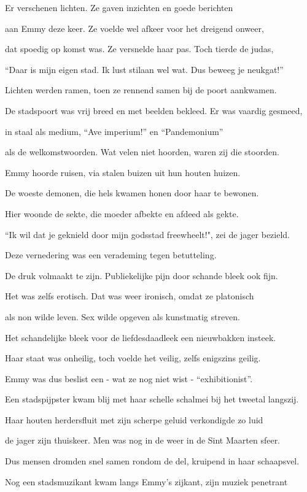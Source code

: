 Er verschenen lichten.
Ze gaven inzichten
en goede berichten

aan Emmy deze keer.
Ze voelde wel afkeer
voor het dreigend onweer,

dat spoedig op komst was.
Ze versnelde haar pas.
Toch tierde de judas,

“Daar is mijn eigen stad.
Ik lust stilaan wel wat.
Dus beweeg je neukgat!”

Lichten werden ramen,
toen ze rennend samen
bij de poort aankwamen.

De stadspoort was vrij breed
en met beelden bekleed.
Er was vaardig gesmeed,

in staal als medium,
“Ave imperium!”
en “Pandemonium”

als de welkomstwoorden.
Wat velen niet hoorden,
waren zij die stoorden.

Emmy hoorde ruisen,
via stalen buizen
uit hun houten huizen.

De woeste demonen,
die hels kwamen honen
door haar te bewonen.

Hier woonde de sekte,
die moeder afbekte
en afdeed als gekte.

“Ik wil dat je geknield
door mijn godsstad freewheelt!",
zei de jager bezield.

Deze vernedering
was een verademing
tegen betutteling.

De druk volmaakt te zijn.
Publiekelijke pijn
door schande bleek ook fijn.

Het was zelfs erotisch.
Dat was weer ironisch,
omdat ze platonisch

als non wilde leven.
Sex wilde opgeven
als kunstmatig streven.

Het schandelijke bleek
voor de liefdesdaadleek
een nieuwbakken insteek.

Haar staat was onheilig,
toch voelde het veilig,
zelfs enigszins geilig.

Emmy was dus beslist
een - wat ze nog niet wist -
“exhibitionist”.

Een stadspijpster kwam blij
met haar schelle schalmei
bij het tweetal langszij.

Haar houten herdersfluit
met zijn scherpe geluid
verkondigde zo luid

de jager zijn thuiskeer.
Men was nog in de weer
in de Sint Maarten sfeer.

Dus mensen dromden snel samen rondom de del,
kruipend in haar schaapsvel.

Nog een stadsmuzikant
kwam langs Emmy’s zijkant,
zijn muziek penetrant

